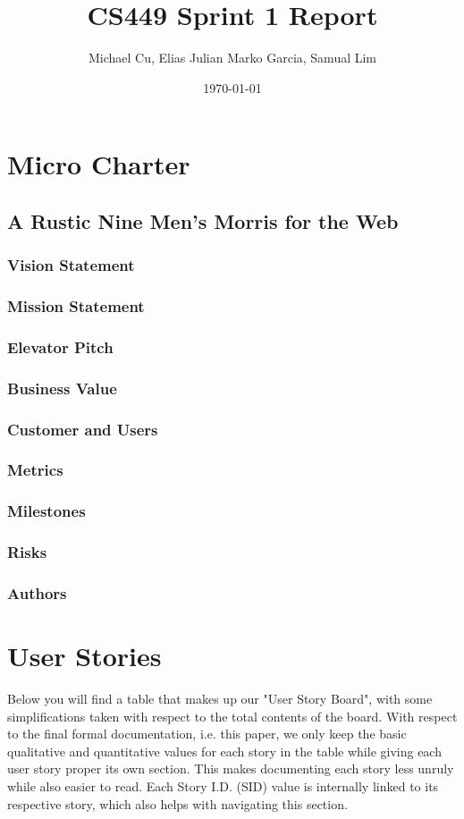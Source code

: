 \documentclass[11pt]{article}
\author{Michael Cu, Elias Julian Marko Garcia, Samual Lim}
\date{\today}
\title{CS449 Sprint 1 Report}
\begin{document}
\maketitle
\tableofcontents


\section{Micro Charter}
\label{sec:org1445870}
\subsection{A Rustic Nine Men's Morris for the Web}
\label{sec:org70c2ed4}
\subsubsection*{Vision Statement}
\label{sec:orgce89b4a}
\subsubsection*{Mission Statement}
\label{sec:org4023fa4}
\subsubsection*{Elevator Pitch}
\label{sec:org798f1de}
\subsubsection*{Business Value}
\label{sec:orgadc69ad}
\subsubsection*{Customer and Users}
\label{sec:org42a7144}
\subsubsection*{Metrics}
\label{sec:orgbfbd243}
\subsubsection*{Milestones}
\label{sec:orgbc0ccb7}
\subsubsection*{Risks}
\label{sec:org55f30a6}
\subsubsection*{Authors}
\label{sec:org6ec7639}
\section{User Stories}
\label{sec:org8cd8f44}
Below you will find a table that makes up our "User Story Board", with some simplifications taken
with respect to the total contents of the board. With respect to the final formal documentation,
i.e. this paper, we only keep the basic qualitative and quantitative values for each story in the
table while giving each user story proper its own section. This makes documenting each story
less unruly while also easier to read. Each Story I.D. (SID) value is internally linked to its
respective story, which also helps with navigating this section.
\end{document}
